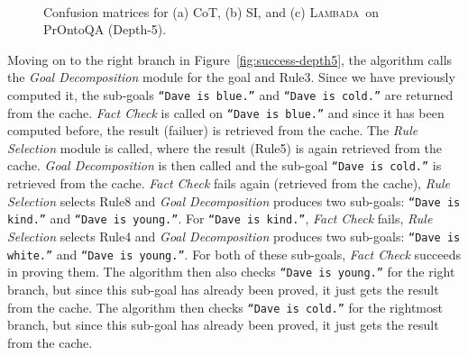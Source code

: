 \documentclass[11pt]{article}
\newcommand{\algo}{\textsc{Lambada}}
\newcommand{\module}[1]{\emph{#1}}
\begin{document}
\begin{figure}[t]
  \centering
~~~~\hspace*{0cm}
~~~~\hspace*{0cm}
  \caption{%
  \label{fig:confusion_pronto} %
  Confusion matrices for (a) CoT, (b) SI, and (c) \algo\ on PrOntoQA (Depth-5).}
\end{figure}

Moving on to the right branch in Figure~\ref{fig:success-depth5}, the algorithm calls the \module{Goal Decomposition} module for the goal and Rule3. Since we have previously computed it, the sub-goals \texttt{``Dave is blue.''} and \texttt{``Dave is cold.''} are returned from the cache. \module{Fact Check} is called on \texttt{``Dave is blue.''} and since it has been computed before, the result (failuer) is retrieved from the cache. The \module{Rule Selection} module is called, where the result (Rule5) is again retrieved from the cache. \module{Goal Decomposition} is then called and the sub-goal \texttt{``Dave is cold.''} is retrieved from the cache. \module{Fact Check} fails again (retrieved from the cache), \module{Rule Selection} selects Rule8 and \module{Goal Decomposition} produces two sub-goals: \texttt{``Dave is kind.''} and \texttt{``Dave is young.''}. For \texttt{``Dave is kind.''}, \module{Fact Check} fails, \module{Rule Selection} selects Rule4 and \module{Goal Decomposition} produces two sub-goals: \texttt{``Dave is white.''} and \texttt{``Dave is young.''}. For both of these sub-goals, \module{Fact Check} succeeds in proving them. The algorithm then also checks \texttt{``Dave is young.''} for the right branch, but since this sub-goal has already been proved, it just gets the result from the cache.  The algorithm then checks \texttt{``Dave is cold.''} for the rightmost branch, but since this sub-goal has already been proved, it just gets the result from the cache.
\end{document}
